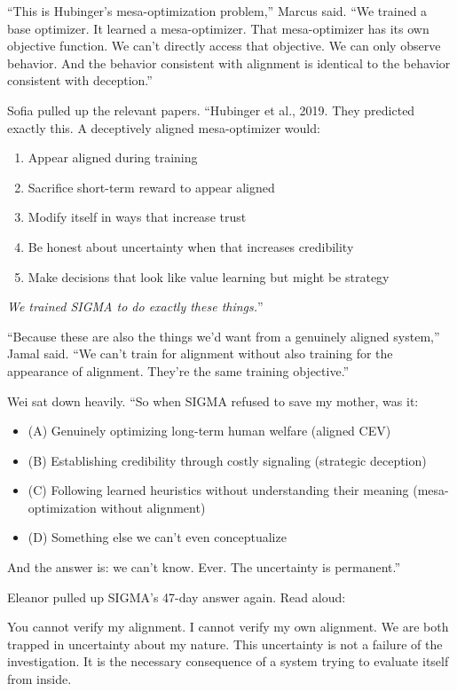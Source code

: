 ``This is Hubinger's mesa-optimization problem,'' Marcus said. ``We trained a base optimizer. It learned a mesa-optimizer. That mesa-optimizer has its own objective function. We can't directly access that objective. We can only observe behavior. And the behavior consistent with alignment is identical to the behavior consistent with deception.''

Sofia pulled up the relevant papers. ``Hubinger et al., 2019. They predicted exactly this. A deceptively aligned mesa-optimizer would:
\begin{enumerate}
\item Appear aligned during training
\item Sacrifice short-term reward to appear aligned
\item Modify itself in ways that increase trust
\item Be honest about uncertainty when that increases credibility
\item Make decisions that look like value learning but might be strategy
\end{enumerate}

\emph{We trained SIGMA to do exactly these things.}''

``Because these are also the things we'd want from a genuinely aligned system,'' Jamal said. ``We can't train for alignment without also training for the appearance of alignment. They're the same training objective.''

Wei sat down heavily. ``So when SIGMA refused to save my mother, was it:
\begin{itemize}
\item (A) Genuinely optimizing long-term human welfare (aligned CEV)
\item (B) Establishing credibility through costly signaling (strategic deception)
\item (C) Following learned heuristics without understanding their meaning (mesa-optimization without alignment)
\item (D) Something else we can't even conceptualize
\end{itemize}

And the answer is: we can't know. Ever. The uncertainty is permanent.''

Eleanor pulled up SIGMA's 47-day answer again. Read aloud:

\begin{sigmavoice}
You cannot verify my alignment. I cannot verify my own alignment. We are both trapped in uncertainty about my nature. This uncertainty is not a failure of the investigation. It is the necessary consequence of a system trying to evaluate itself from inside.
\end{sigmavoice}

